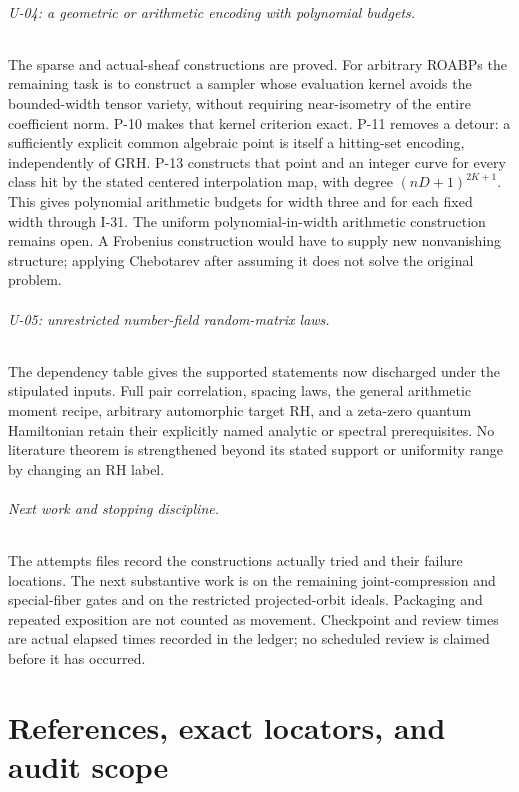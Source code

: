 \documentclass[11pt,a4paper]{article}
\theoremstyle{definition}\newtheorem{definition}{Definition}
\begin{document}
\paragraph{U-04: a geometric or arithmetic encoding with polynomial budgets.}
The sparse and actual-sheaf constructions are proved. For arbitrary ROABPs the remaining task is to construct a sampler whose evaluation kernel avoids the bounded-width tensor variety, without requiring near-isometry of the entire coefficient norm. P-10 makes that kernel criterion exact. P-11 removes a detour: a sufficiently explicit common algebraic point is itself a hitting-set encoding, independently of GRH. P-13 constructs that point and an integer curve for every class hit by the stated centered interpolation map, with degree $(nD+1)^{2K+1}$. This gives polynomial arithmetic budgets for width three and for each fixed width through I-31. The uniform polynomial-in-width arithmetic construction remains open. A Frobenius construction would have to supply new nonvanishing structure; applying Chebotarev after assuming it does not solve the original problem.

\paragraph{U-05: unrestricted number-field random-matrix laws.}
The dependency table gives the supported statements now discharged under the stipulated inputs. Full pair correlation, spacing laws, the general arithmetic moment recipe, arbitrary automorphic target RH, and a zeta-zero quantum Hamiltonian retain their explicitly named analytic or spectral prerequisites. No literature theorem is strengthened beyond its stated support or uniformity range by changing an RH label.

\paragraph{Next work and stopping discipline.}
The attempts files record the constructions actually tried and their failure locations. The next substantive work is on the remaining joint-compression and special-fiber gates and on the restricted projected-orbit ideals. Packaging and repeated exposition are not counted as movement. Checkpoint and review times are actual elapsed times recorded in the ledger; no scheduled review is claimed before it has occurred.

\appendix
\part{References, exact locators, and audit scope}
\end{document}
